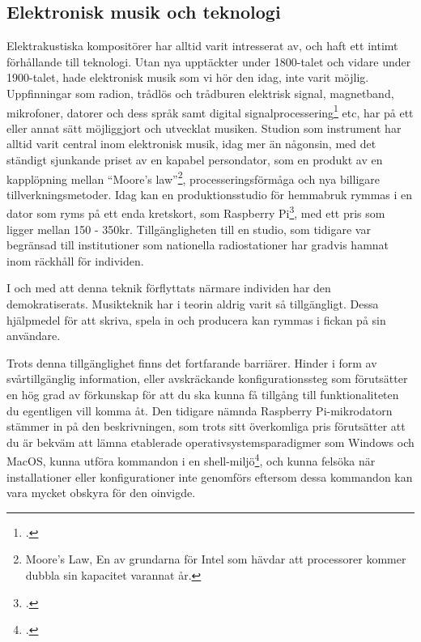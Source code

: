 \documentclass{article}
\begin{document}

\subsection{Elektronisk musik och teknologi}
Elektrakustiska kompositörer har alltid varit intresserat av, och haft ett intimt förhållande till teknologi.
Utan nya upptäckter under 1800-talet och vidare under 1900-talet, hade elektronisk musik som vi hör den idag,
inte varit möjlig. Uppfinningar som radion, trådlös och trådburen elektrisk signal, magnetband, mikrofoner,
datorer och dess språk samt digital signalprocessering\footcite{dsp} etc, har på ett eller annat sätt
möjliggjort och utvecklat musiken. Studion som instrument har alltid varit central inom elektronisk musik,
idag mer än någonsin, med det ständigt sjunkande priset av en kapabel persondator, som en produkt av en
kapplöpning mellan ``Moore's law''\footnote{Moore's Law, En av grundarna för Intel som hävdar att processorer
kommer dubbla sin kapacitet varannat år.}, processeringsförmåga och nya billigare tillverkningsmetoder. Idag
kan en produktionsstudio för hemmabruk rymmas i en dator som ryms på ett enda kretskort, som Raspberry
Pi\footcite{rpi}, med ett pris som ligger mellan 150 - 350kr. Tillgängligheten till en studio, som tidigare
var begränsad till institutioner som nationella radiostationer har gradvis hamnat inom räckhåll för
individen.

I och med att denna teknik förflyttats närmare individen har den demokratiserats. Musikteknik har i teorin
aldrig varit så tillgängligt. Dessa hjälpmedel för att skriva, spela in och producera kan rymmas i
fickan på sin användare.

Trots denna tillgänglighet finns det fortfarande barriärer. Hinder i form av svårtillgänglig information,
eller avskräckande konfigurationssteg som förutsätter en hög grad av förkunskap för att du ska kunna få
tillgång till funktionaliteten du egentligen vill komma åt. Den tidigare nämnda Raspberry Pi-mikrodatorn
stämmer in på den beskrivningen, som trots sitt överkomliga pris förutsätter att du är bekväm att lämna
etablerade operativsystemsparadigmer som Windows och MacOS, kunna utföra kommandon i en
shell-miljö\footcite{unix}, och kunna felsöka när installationer eller konfigurationer inte genomförs
eftersom dessa kommandon kan vara mycket obskyra för den oinvigde.
	
\end{document}
